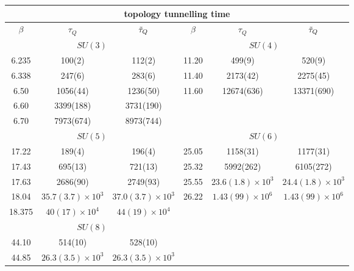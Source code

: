 \documentclass[12pt]{article}
\begin{document}



\begin{table}[htb]
\centering
\begin{tabular}{|ccc|ccc|} \hline
\multicolumn{6}{|c|}{topology tunnelling time} \\ \hline
$\beta$ &  $\tau_Q$ & $\Tilde{\tau}_Q$ & $\beta$ &  $\tau_Q$ & $\Tilde{\tau}_Q$ \\ \hline
\multicolumn{3}{|c|}{$SU(3)$} & \multicolumn{3}{|c|}{$SU(4)$} \\ \hline
 6.235 & 100(2)   & 112(2)   & 11.20 & 499(9)   & 520(9)    \\    
 6.338 & 247(6)   & 283(6)   & 11.40 & 2173(42) & 2275(45)    \\  
 6.50  & 1056(44) & 1236(50) & 11.60 & 12674(636) & 13371(690)  \\
 6.60  & 3399(188) & 3731(190) &     &          &               \\
 6.70  & 7973(674) & 8973(744) &     &          &              \\ \hline
\multicolumn{3}{|c|}{$SU(5)$} & \multicolumn{3}{|c|}{$SU(6)$} \\ \hline
17.22  & 189(4)   &  196(4)   & 25.05 & 1158(31)   & 1177(31)    \\
17.43  & 695(13)  &  721(13)  & 25.32 & 5992(262)  & 6105(272)   \\
17.63  & 2686(90) & 2749(93)  & 25.55 & $23.6(1.8)\times 10^3$  &  $24.4(1.8)\times 10^3$   \\
18.04  & $35.7(3.7)\times 10^3$ & $37.0(3.7)\times 10^3$ & 26.22 & $1.43(99)\times 10^6$  & $1.43(99)\times 10^6$ \\
18.375 & $40(17)\times 10^4$    & $44(19)\times10^4$    &       &  & \\ \hline
\multicolumn{3}{|c|}{$SU(8)$} & \multicolumn{3}{|c|}{} \\ \hline
 44.10 & 514(10)                & 528(10)                  &   &  &  \\
 44.85 & $26.3(3.5)\times 10^3$ & $26.3(3.5)\times 10^3$   &  &   &    \\ 

\end{tabular}
\end{table}
\end{document}
